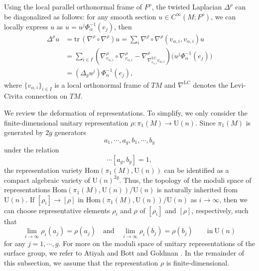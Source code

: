 \documentclass[11pt,oneside,reqno]{amsart}
\theoremstyle{definition}
\numberwithin{equation}{section}
\theoremstyle{plain}
\begin{document}
Using the local parallel orthonormal frame of $F^\rho$, the twisted Laplacian $\Delta^\rho$ can be diagonalized as follows: for any smooth section $u\in C^{\infty}(M;F^\rho)$, we can locally express $u$ as $u=u^j \Phi_\alpha^{-1}(e_j)$, then
\begin{equation}\label{diagofLaplacian1}
\begin{aligned}
    \Delta^\rho u &= \mathrm{tr}\,(\nabla^\rho \circ \nabla^\rho) u = \sum_i \nabla^\rho \circ \nabla^\rho (v_{\alpha,i},v_{\alpha,i}) u  \\
    &=\sum_{i\in I} \left(\nabla^\rho_{v_{\alpha,i}} \circ \nabla^\rho_{v_{\alpha,i}} - \nabla^\rho_{\nabla^{\mathrm{LC}}_{v_{\alpha,i}} v_{\alpha,i}} \right) \big(u^j \Phi_\alpha^{-1}(e_j) \big)   \\
    &=(\Delta_g u^j )\Phi_\alpha^{-1}(e_j),
\end{aligned}
\end{equation}
where $\{v_{\alpha,i}\}_{i\in I}$ is a local orthonormal frame of $TM$ and $\nabla^{\mathrm{LC}}$ denotes the Levi-Civita connection on $TM$.

We review the deformation of representations. To simplify, we only consider the finite-dimensional unitary representation $\rho: \pi_1(M)\to \mathrm{U}(n)$. Since $\pi_1(M)$ is generated by $2g$ generators 
\begin{equation*}
    a_1,\cdots,a_g,b_1,\cdots,b_g
\end{equation*}
under the relation 
\begin{equation*}
    [a_1,b_1]\cdots[a_g,b_g]=1,
\end{equation*}
the representation variety $\mathrm{Hom}(\pi_1(M),\mathrm{U}(n))$ can be identified as a compact algebraic variety of $\mathrm{U}(n)^{2g}$. Thus, the topology of the moduli space of representations $\mathrm{Hom}(\pi_1(M),\mathrm{U}(n))/\mathrm{U}(n)$ is naturally inherited from $\mathrm{U}(n)$.  If $[\rho_i]\to [\rho]$ in $\mathrm{Hom}(\pi_1(M),\mathrm{U}(n))/\mathrm{U}(n)$ as $i \rightarrow \infty$, then we can choose representative elements $\rho_i$ and $\rho$ of $[\rho_i]$ and $[\rho]$, respectively, such that 
\begin{equation*}
    \lim_{i\rightarrow \infty} \rho_i(a_j) = \rho(a_j) \quad \mathrm{and} \quad \lim_{i\rightarrow \infty} \rho_i(b_j) = \rho(b_j) \qquad \mathrm{in}\ \mathrm{U}(n)
\end{equation*}
for any $j=1,\cdots,g$. For more on the moduli space of unitary representations of the surface group, we refer to Atiyah and Bott \cite{atiyah1983yang} and Goldman \cite{goldman1984symplectic}. In the remainder of this subsection, we assume that the representation $\rho$ is finite-dimensional. 
\end{document}
